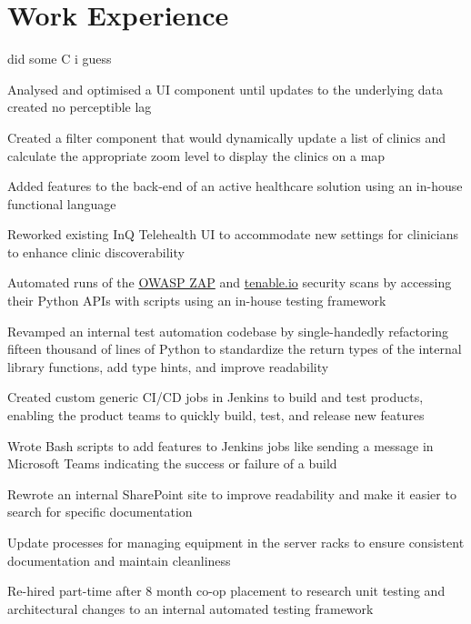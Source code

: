 \section{Work Experience}

\begin{bullets}
    \item did some C i guess %
\end{bullets}

\hbox{}

\begin{bullets}
    \item Analysed and optimised a UI component until updates to the underlying data created no perceptible lag
    \item Created a filter component that would dynamically update a list of clinics and calculate the appropriate zoom level to display the clinics on a map
    \item Added features to the back-end of an active healthcare solution using an in-house functional language
    \item Reworked existing InQ Telehealth UI to accommodate new settings for clinicians to enhance clinic discoverability
\end{bullets}

\hbox{}

\begin{bullets}
    \item Automated runs of the \href{https://www.zaproxy.org/}{OWASP ZAP} and \href{https://www.tenable.com/products/tenable-io}{tenable.io} security scans by accessing their Python APIs with scripts using an in-house testing framework
    \item Revamped an internal test automation codebase by single-handedly refactoring fifteen thousand of lines of Python to standardize the return types of the internal library functions, add type hints, and improve readability
    \item Created custom generic CI/CD jobs in Jenkins to build and test products, enabling the product teams to quickly build, test, and release new features
    \item Wrote Bash scripts to add features to Jenkins jobs like sending a message in Microsoft Teams indicating the success or failure of a build
    \item Rewrote an internal SharePoint site to improve readability and make it easier to search for specific documentation
    \item Update processes for managing equipment in the server racks to ensure consistent documentation and maintain cleanliness
    \item Re-hired part-time after 8 month co-op placement to research unit testing and architectural changes to an internal automated testing framework
\end{bullets}

